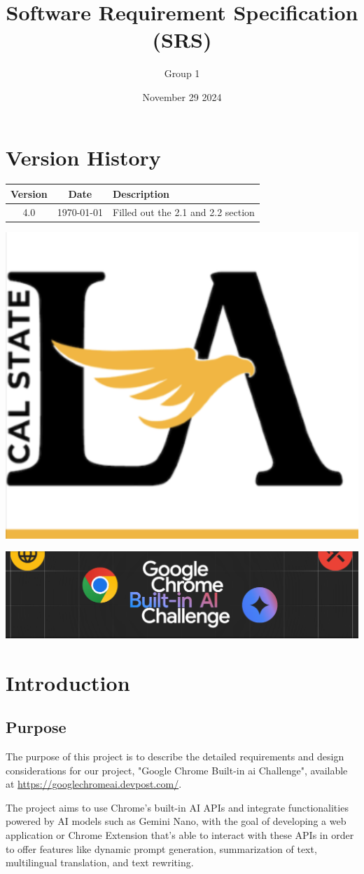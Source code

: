 \documentclass{article}
\title{Software Requirement Specification (SRS)}
\author{Group 1 }
\date{November 29 2024}
\begin{document}
\maketitle  
\pagebreak

\tableofcontents
\pagebreak

\section*{Version History}
\begin{longtable}{|c|c|p{10cm}|}
\hline
\textbf{Version} & \textbf{Date} & \textbf{Description} \\ \hline
4.0 & \today & Filled out the 2.1 and 2.2 section \\ \hline
\end{longtable}
\pagebreak

\includegraphics[width=0.3\linewidth]{./logo/csula.png} 

\includegraphics[width=0.3\linewidth]{./logo/chromeai.png} 

\section{Introduction}
\subsection{Purpose}
The purpose of this project is to describe the detailed requirements and design considerations for our project, "Google Chrome Built-in \Gls{ai} Challenge", available at \url{https://googlechromeai.devpost.com/}.

The project aims to use Chrome's built-in AI APIs and integrate functionalities powered by AI models such as Gemini Nano, with the goal of developing a web application or Chrome Extension that's able to interact with these APIs in order to offer features like dynamic prompt generation, summarization of text, multilingual translation, and text rewriting.
\end{document}
